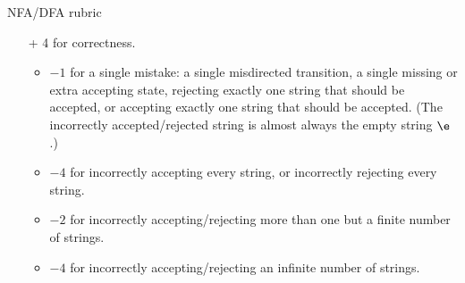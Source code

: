 \documentclass[11pt]{article}
\begin{document}
\begin{enumerate}
\begin{Rubric}{NFA/DFA rubric}
\begin{itemize}
\begin{itemize}
\item Yes, we mean it. A perfectly correct drawing of a perfectly correct DFA with no state explanation
is worth at most 6 points.
\end{itemize}
\item[+ 4] for correctness. 
\begin{itemize}
\item $-1$ for a single mistake: a single misdirected transition, a single missing or extra accepting state,
rejecting exactly one string that should be accepted, or accepting exactly one string that should
be accepted. (The incorrectly accepted/rejected string is almost always the empty string $\e$.)
\item $-4$ for incorrectly accepting every string, or incorrectly rejecting every string.
\item $-2$ for incorrectly accepting/rejecting more than one but a finite number of strings.
\item $-4$ for incorrectly accepting/rejecting an infinite number of strings.
\end{itemize}
\end{itemize}
\end{Rubric}


\end{enumerate}
\end{document}
